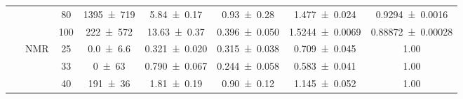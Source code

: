 \begin{table}[!ht]
\begin{tabular}{c|cc ccccc}
        ~ & ~ & 80 & \num{1395 \pm 719} & \num{5.84 \pm 0.17} & \num{0.93 \pm 0.28} & \num{1.477 \pm 0.024} & \num{0.9294 \pm 0.0016} \\
        ~ & ~ & 100 & \num{222 \pm 572} & \num{13.63 \pm 0.37} & \num{0.396 \pm 0.050} & \num{1.5244 \pm 0.0069} & \num{0.88872 \pm 0.00028} \\
        \cline{2-8}
        ~ & \multirow{3}{*}{NMR} & 25 & \num{0.0 \pm 6.6} & \num{0.321 \pm 0.020} & \num{0.315 \pm 0.038} & \num{0.709 \pm 0.045} & 1.00 \\
        ~ & ~ & 33 & \num{0 \pm 63} & \num{0.790 \pm 0.067} & \num{0.244 \pm 0.058} & \num{0.583 \pm 0.041} & 1.00 \\
        ~ & ~ & 40 & \num{191 \pm 36} & \num{1.81 \pm 0.19} & \num{0.90 \pm 0.12} & \num{1.145 \pm 0.052} & 1.00 \\
    \end{tabular}
\end{table}
